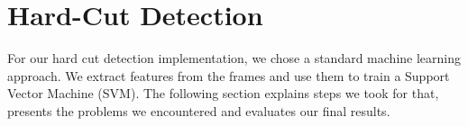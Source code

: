\section{Hard-Cut Detection}
\label{sec:hard_cut}

For our hard cut detection implementation, we chose a standard machine learning approach.
We extract features from the frames and use them to train a Support Vector Machine (SVM).
The following section explains steps we took for that, presents the problems we encountered and evaluates our final results.




